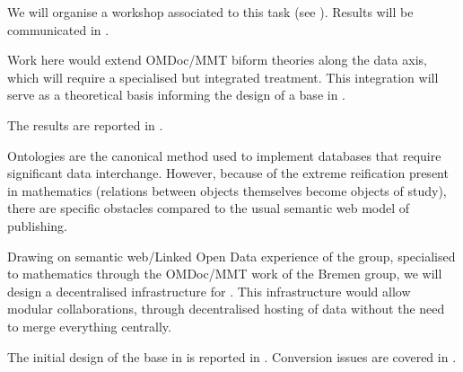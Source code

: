\begin{workpackage}[id=dksbases,%
  title=Data/Knowledge/Software-Bases,lead=FAU,
  ZHRM=12,JURM=12,FAURM=34,UWRM=25,SARM=10,LLRM=2,PSRM=25]
\begin{tasklist}
\begin{task}[title={Survey of existing \DKS bases, Formulation of requirements},
  id=data-assessment,lead=ZH,partners={JU,SA,UW,US},wphases=0-3,PM=4,issue=123]
  We will organise a workshop associated to this task (see
  ). Results will be communicated in
  .
\end{task}

\begin{task}[title=Triform Theories in OMDoc/MMT,id=data-triform,
  lead=JU,partners={ZH},PM=12,wphases=0-12,issue=124]
  Work here would extend OMDoc/MMT biform theories along the data axis, which will require
  a specialised but integrated treatment. This integration will serve as a theoretical
  basis informing the design of a \DKS base in .

  The results are reported in .
\end{task}

\begin{task}[id=data-design,lead=JU,partners={ZH,US,SA,UW,LL,FAU},wphases={6-12,15-18!.33},PM=12,
  title={\DKS Base Design},issue=125]
  Ontologies are the canonical method used to implement databases that require significant
  data interchange. However, because of the extreme reification present in mathematics
  (relations between objects themselves become objects of study), there are specific
  obstacles compared to the usual semantic web model of publishing.

  Drawing on semantic web/Linked Open Data experience of the  group, specialised
  to mathematics through the OMDoc/MMT work of the Bremen group, we will design a
  decentralised infrastructure for \TheProject. This infrastructure would allow modular
  collaborations, through decentralised hosting of data without the need to merge
  everything centrally.
  
  The initial design of the \DKS base in \TheProject is reported in
 . Conversion issues are covered in .
\end{task}


\end{tasklist}
\end{workpackage}
